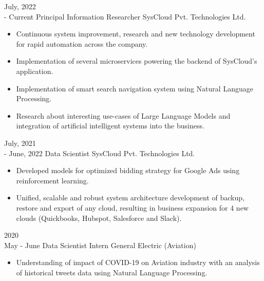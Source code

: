 \documentclass[9pt]{developercv} %
\begin{document}
\vspace{-10 pt}
\begin{entrylist}
	\entry
		{July, 2022\\ - Current}
		{Principal Information Researcher}
		{SysCloud Pvt. Technologies Ltd.}
		{\vspace{-10pt}
        \begin{itemize}[noitemsep,topsep=0pt,parsep=0pt,partopsep=0pt, leftmargin=-1pt]
            \item Continuous system improvement, research and new technology development for rapid automation across the company.
            \item Implementation of several microservices powering the backend of SysCloud's application.
            \item Implementation of smart search navigation system using Natural Language Processing.
            \item Research about interesting use-cases of Large Language Models and integration of artificial intelligent systems into the business.
        \end{itemize}
        }
    \entry
		{July, 2021\\- June, 2022}
		{Data Scientist}
		{SysCloud Pvt. Technologies Ltd.}
		{\vspace{-10pt}
        \begin{itemize}[noitemsep,topsep=0pt,parsep=0pt,partopsep=0pt, leftmargin=-1pt]
            \item Developed models for optimized bidding strategy for Google Ads using reinforcement learning.
            \item Unified, scalable and robust system architecture development of backup, restore and export of any cloud, resulting in business expansion for 4 new clouds (Quickbooks, Hubspot, Salesforce and Slack).
        \end{itemize}
        }
    \entry
		{2020\\\footnotesize{May - June}}
		{Data Scientist Intern}
		{General Electric (Aviation)}
		{\vspace{-10pt}
        \begin{itemize}[noitemsep,topsep=0pt,parsep=0pt,partopsep=0pt, leftmargin=-1pt]
            \item Understanding of impact of COVID-19 on Aviation industry with an analysis of historical tweets data using Natural Language Processing.

\end{itemize}}
\end{entrylist}
\end{document}
